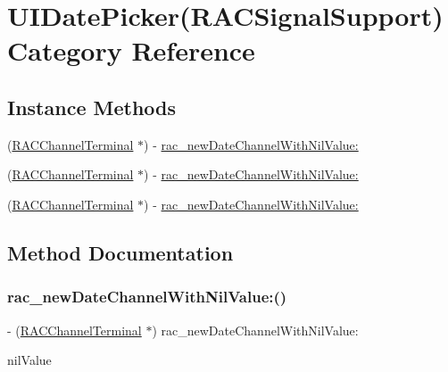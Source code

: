\hypertarget{category_u_i_date_picker_07_r_a_c_signal_support_08}{}\section{U\+I\+Date\+Picker(R\+A\+C\+Signal\+Support) Category Reference}
\label{category_u_i_date_picker_07_r_a_c_signal_support_08}
\subsection*{Instance Methods}
\begin{DoxyCompactItemize}
\item 
(\mbox{\hyperlink{interface_r_a_c_channel_terminal}{R\+A\+C\+Channel\+Terminal}} $\ast$) -\/ \mbox{\hyperlink{category_u_i_date_picker_07_r_a_c_signal_support_08_a705ad402ec1a4e421f24153a2f484f3f}{rac\+\_\+new\+Date\+Channel\+With\+Nil\+Value\+:}}
\item 
(\mbox{\hyperlink{interface_r_a_c_channel_terminal}{R\+A\+C\+Channel\+Terminal}} $\ast$) -\/ \mbox{\hyperlink{category_u_i_date_picker_07_r_a_c_signal_support_08_a705ad402ec1a4e421f24153a2f484f3f}{rac\+\_\+new\+Date\+Channel\+With\+Nil\+Value\+:}}
\item 
(\mbox{\hyperlink{interface_r_a_c_channel_terminal}{R\+A\+C\+Channel\+Terminal}} $\ast$) -\/ \mbox{\hyperlink{category_u_i_date_picker_07_r_a_c_signal_support_08_a705ad402ec1a4e421f24153a2f484f3f}{rac\+\_\+new\+Date\+Channel\+With\+Nil\+Value\+:}}
\end{DoxyCompactItemize}


\subsection{Method Documentation}
\mbox{\label{category_u_i_date_picker_07_r_a_c_signal_support_08_a705ad402ec1a4e421f24153a2f484f3f}} 
\subsubsection{\texorpdfstring{rac\+\_\+new\+Date\+Channel\+With\+Nil\+Value\+:()}{rac\_newDateChannelWithNilValue:()}\hspace{0.1cm}{\footnotesize\ttfamily [1/3]}}
{\footnotesize\ttfamily -\/ (\mbox{\hyperlink{interface_r_a_c_channel_terminal}{R\+A\+C\+Channel\+Terminal}} $\ast$) rac\+\_\+new\+Date\+Channel\+With\+Nil\+Value\+: \begin{DoxyParamCaption}\item[{(N\+S\+Date $\ast$)}]{nil\+Value }\end{DoxyParamCaption}}

